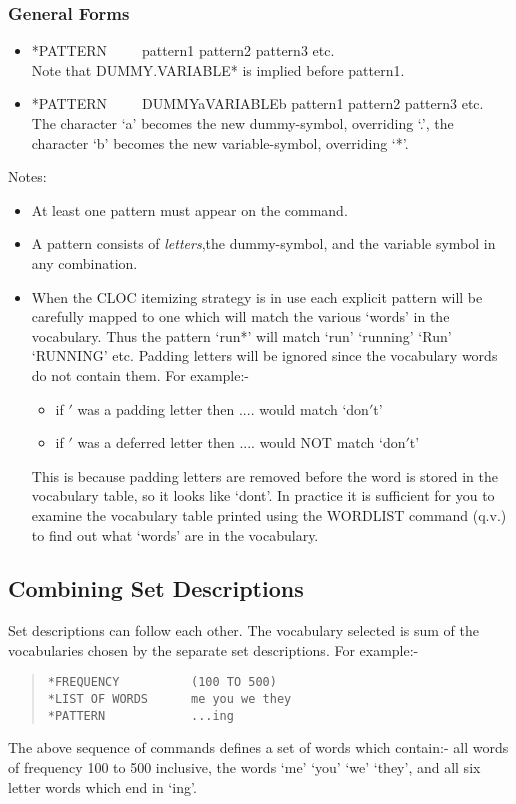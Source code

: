 \subsubsection{General Forms}
\begin{itemize}
\item     *PATTERN~~~~~pattern1 pattern2 pattern3 etc.\\
      Note that DUMMY.VARIABLE* is implied before pattern1.
\item     *PATTERN~~~~~DUMMYaVARIABLEb pattern1 pattern2 pattern3 etc.\\
      The character `a' becomes the new dummy-symbol, overriding `.',
      the character `b' becomes the new variable-symbol, overriding `*'.
\end{itemize}

Notes:
\begin{itemize}
\item   At least one pattern must appear on the command.
\item   A pattern consists of {\em letters},the dummy-symbol, and the variable
symbol in any combination.
\item   When the CLOC itemizing strategy is in use each explicit
        pattern will be carefully mapped to one which will match
        the various `words' in the vocabulary. Thus the pattern `run*'
        will match `run' `running' `Run' `RUNNING' etc. Padding letters will
        be ignored since the vocabulary words do not contain them.
        For example:-
        \begin{itemize}
\item if $'$ was a padding letter then .... would match `don$'$t'
\item if $'$ was a deferred letter then .... would NOT match `don$'$t'
        \end{itemize}
This is because padding letters are removed before the
word is stored in the vocabulary table, so it looks like `dont'.
In practice it is sufficient for you to examine the vocabulary table
printed using the WORDLIST command (q.v.) to find out what `words'
are in the vocabulary.
\end{itemize}

\subsection{Combining Set Descriptions}
Set descriptions can follow each other. The vocabulary selected is
sum of the vocabularies chosen by the separate set descriptions.
For example:-
\begin{quote}
\begin{verbatim}
*FREQUENCY          (100 TO 500)
*LIST OF WORDS      me you we they
*PATTERN            ...ing
\end{verbatim}
\end{quote}
The above sequence of commands defines a set of words which
contain:- all words of frequency 100 to 500 inclusive, the words
`me' `you' `we' `they', and all six letter words which end in `ing'.

